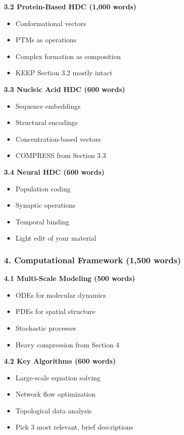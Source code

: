 \documentclass[11pt]{article}
\begin{document}
\textbf{3.2 Protein-Based HDC (1,000 words)}
\begin{itemize}
    \item Conformational vectors
    \item PTMs as operations
    \item Complex formation as composition
    \item \textcolor{keep}{KEEP Section 3.2 mostly intact}
\end{itemize}

\textbf{3.3 Nucleic Acid HDC (600 words)}
\begin{itemize}
    \item Sequence embeddings
    \item Structural encodings
    \item Concentration-based vectors
    \item \textcolor{compress}{COMPRESS from Section 3.3}
\end{itemize}

\textbf{3.4 Neural HDC (600 words)}
\begin{itemize}
    \item Population coding
    \item Synaptic operations
    \item Temporal binding
    \item \textcolor{keep}{Light edit of your material}
\end{itemize}

\subsubsection{4. Computational Framework (1,500 words)}

\textbf{4.1 Multi-Scale Modeling (500 words)}
\begin{itemize}
    \item ODEs for molecular dynamics
    \item PDEs for spatial structure
    \item Stochastic processes
    \item \textcolor{compress}{Heavy compression from Section 4}
\end{itemize}

\textbf{4.2 Key Algorithms (600 words)}
\begin{itemize}
    \item Large-scale equation solving
    \item Network flow optimization
    \item Topological data analysis
    \item \textcolor{compress}{Pick 3 most relevant, brief descriptions}
\end{itemize}
\end{document}

